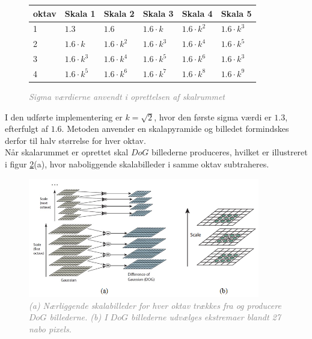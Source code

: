 \begin{figure}[H]
    \centering
    \begin{center}    
    \begin{tabular}{ | l | l | l | l | l | l | }
    \hline
    oktav & Skala 1 & Skala 2 & Skala 3 & Skala 4 & Skala 5 \\ \hline
    1 & $1.3$ & $1.6$ & $1.6 \cdot k$ & $1.6 \cdot k^2$ & $1.6 \cdot k^3$ \\ \hline
  	2 & $1.6 \cdot k$ & $1.6 \cdot k^2$ & $1.6 \cdot k^3$ & $1.6 \cdot k^4$ & $1.6 \cdot k^5$ \\ \hline
  	3 & $1.6 \cdot k^3$ & $1.6 \cdot k^4$ & $1.6 \cdot k^5$ & $1.6 \cdot k^6$ & $1.6 \cdot k^3$ \\ \hline
  	4 & $1.6 \cdot k^5$ & $1.6 \cdot k^6$ & $1.6 \cdot k^7$ & $1.6 \cdot k^8$ & $1.6 \cdot k^9$ \\ \hline
    \end{tabular}       
    \caption{\textcolor{gray}{\footnotesize \textit{Sigma værdierne anvendt i oprettelsen af skalrummet}}}
    \label{fig:secderivfiltersize}
     \end{center}
     \vspace{-2.5em}
  \end{figure} \noindent
 I den udførte implementering er $k=\sqrt{2}$, hvor den første sigma værdi er $1.3$, efterfulgt af $1.6$.  Metoden anvender en skalapyramide og billedet formindskes derfor til halv størrelse for hver oktav. \\ 
Når skalarummet er oprettet skal $DoG$ billederne produceres, hvilket er illustreret i figur \ref{fig:difference}(a), hvor naboliggende skalabilleder i samme oktav subtraheres. 
\begin{figure}[H]
    \centering
    \includegraphics[width=0.90\textwidth]{fig/30.png}
     \vspace{-1em}
    \begin{center}    
       \caption{\textcolor{gray}{\footnotesize \textit{(a) Nærliggende skalabilleder for hver oktav trækkes fra og producere $DoG$ billederne. (b) I  $DoG$ billederne udvælges ekstremaer blandt 27 nabo pixels.}}}
    \label{fig:difference}
     \end{center}
     \vspace{-2.5em}
  \end{figure} \noindent    
